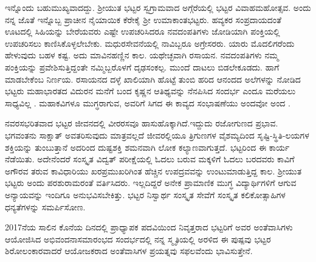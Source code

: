 ಇನ್ನೊಂದು ಬಹುಮುಖ್ಯವಾದದ್ದು. ಶ್ರೀಯುತ ಭಟ್ಟರ ಸ್ವಗ್ರಾಮವಾದ ಅಗ್ಗೆರೆಯಲ್ಲಿ ಭಟ್ಟರ ವಿವಾಹಮಹೋತ್ಸವ. ಅಂದು ನನ್ನ ಜೊತೆ ಇನ್ನೊಬ್ಬ ಪ್ರಾಚೀನ ನೈಯಾಯಿಕ ಕೆರೇಕೈ ಶ್ರೀ ಉಮಾಕಾಂತಭಟ್ಟರು. ಹವ್ಯಕರ ಸಂಪ್ರದಾಯದಂತೆ ಊಟದಲ್ಲಿ ಸಿಹಿಯನ್ನು ಬೇರೆಯವರು ಎಷ್ಟೇ ಉಪಚರಿಸಿದರೂ ನವದಂಪತಿಗಳು ಜೋಡಿಯಾಗಿ ಪಂಕ್ತಿಯಲ್ಲಿ ಉಪಚರಿಸಲು ಕಾಣಿಸಿಕೊಳ್ಳಲೇಬೇಕು. ಮಧುರಸೇವನೆಯಲ್ಲಿ ನಾವಿಬ್ಬರೂ ಅಗ್ರೇಸರರು. ಯಾರು ಮೊದಲಿಗರೆಂದು ಹೇಳುವುದು ಬಹಳ ಕಷ್ಟ. ಅದು ಮಾವಿನಹಣ್ಣಿನ ಕಾಲ. ಯಥೇಚ್ಛವಾಗಿ ರಸಾಯನ. ನವದಂಪತಿಗಳು ನಮ್ಮ ಪಂಕ್ತಿಯನ್ನು ಪ್ರವೇಶಿಸುತ್ತಿದ್ದಂತೇ ನಮ್ಮಿಬ್ಬರೊಳಗೆ ದೃಢಸಂಕಲ್ಪ. ಮುಂದೆ ದಾಟಲು ಬಿಡಲೇಕೂಡದು. ಹಾಗೆ ಮಾಡಬೇಕೆಂಬ ನಿರ್ಣಯ. ರಸಾಯನದ ದಳ್ಳೆ ಖಾಲಿಯಾಗಿ ಹೊಟ್ಟೆ ತುಂಬಿ ಹರಿದ ಆನಂದದ ಅಲೆಗಳನ್ನು ನೋಡಿದ ಭಟ್ಟರು ಮಹಾಭಾರತದ ವಿದುರನ ಮನೆಗೆ ಬಂದ ಕೃಷ್ಣನ ಆತಿಥ್ಯವನ್ನು ನೆನಪಿಸಿದ ಸಂದರ್ಭ ಎಂದೂ ಮರೆಯಲು ಸಾಧ್ಯವಿಲ್ಲ . ಮಹಾಕವಿಗಳೂ ಮುಗ್ಧರಾಗುವ, ಅವರಿಗೆ ಸಿಗದ ಈ ಕಾವ್ಯದ ಸಂಭಾಷಣೆಯು ಅಂದವೋ ಅಂದ .

ನವರಸಭರಿತವಾದ ಭಟ್ಟರ ಜೀವನದಲ್ಲಿ ವೀರರಸವೂ ಹಾಸುಹೊಕ್ಕಾಗಿದೆ.ಇದ್ದುದು ರಜೋಗುಣದ ಪ್ರಭಾವ. ಭಗವಂತನು ಸಾಕ್ಷಾತ್ ಅವತರಿಸುವುದು ಮಾತ್ರವಲ್ಲದೆ ಜೀವರಲ್ಲಿಯೂ ತ್ರಿಗುಣಗಳ ವೈಶಮ್ಯದಿಂದ ಸೃಷ್ಟಿ-ಸ್ಥಿತಿ-ಲಯಗಳ ಶಕ್ತಿಯನ್ನು ತುಂಬುತ್ತಾನೆ ಅದರಿಂದ ದುಷ್ಟಶಕ್ತಿ ಶಮನವಾಗಿ ಲೋಕ ಕಲ್ಯಾಣವಾಗುತ್ತದೆ. ಭಟ್ಟರಿಂದ ಈ ಕಾರ್ಯ ನೆಡೆಯಿತು. ಅದೇನೆಂದರೆ ಸಂಸ್ಕೃತ ವಿದ್ವತ್ ಪರೀಕ್ಷೆಯಲ್ಲಿ ಓದಲು ಬರುವ ಮಕ್ಕಳಿಗೆ ಓದಲು ಬರದವರು ಕಾವಿಗೆ ಅಗೌರವ ತರುವ ಕಾವಿಧಾರಿಯು ಖರಪ್ರಮುಖರಿಗಿಂತ ಹೆಚ್ಚಿನ ಉಪದ್ರವವನ್ನು ಉಂಟುಮಾಡುತ್ತಿದ್ದ ಕಾಲ. ಶ್ರೀಯುತ ಭಟ್ಟರು ಅಂದು ಪರಶುರಾಮರಂತೆ ವರ್ತಿಸಿದರು. ಇಲ್ಲದಿದ್ದರೆ ಅನೇಕ ಪ್ರಾಮಾಣಿಕ ಮುಗ್ಧ ವಿದ್ಯಾರ್ಥಿಗಳಿಗೆ ಆಗುವ ಅನ್ಯಾಯವನ್ನು ಇಂದಿಗೂ ಅನುಭವಿಸಬೇಕಿತ್ತು. ಭಟ್ಟರ ನಿಸ್ವಾರ್ಥ ಸಂಸ್ಕೃತ ಸೇವೆಗೆ ಸಂಸ್ಕೃತ ಕಲಿಕೋತ್ಸಾಹಿಗಳ ಧನ್ಯತೆಗಳನ್ನು ಸಮರ್ಪಿಸೋಣ.

2017ನೆಯ ಸಾಲಿನ ಕೊನೆಯ ದಿನದಲ್ಲಿ ಪ್ರಾಧ್ಯಾಪಕ ಪದವಿಯಿಂದ ನಿವೃತ್ತರಾದ ಭಟ್ಟರಿಗೆ ಅವರ ಅಂತೆವಾಸಿಗಳು ಆಯೋಜಿಸಿದ ಅಭಿವಂದನಾಸಮಾರಂಭದ ಸಂದರ್ಭದಲ್ಲಿ ನನ್ನ ಸ್ಮೃತಿಯಲ್ಲಿ ಅರಳಿದ ಈ ಪುಷ್ಪವು ಭಟ್ಟರ ಶಿರೋಲಂಕಾರವಾದರೆ  ಆಯೋಜಕರಾದ ಅಂತೆವಾಸಿಗಳ ಪ್ರಯತ್ನವು ಸಫಲವೆಂದು ಭಾವಿಸುತ್ತೇನೆ.
